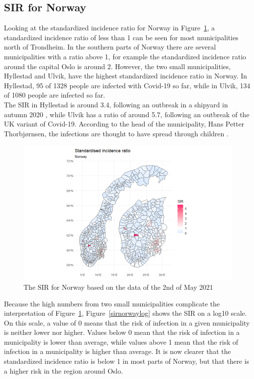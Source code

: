 \subsection{SIR for Norway}
Looking at the standardized incidence ratio for Norway in Figure~\ref{sirnorway}, a standardized incidence ratio of less than 1 can be seen for most municipalities north of Trondheim. In the southern parts of Norway there are several municipalities with a ratio above 1, for example the standardized incidence ratio around the capital Oslo is around 2. However, the two small municipalities, Hyllestad and Ulvik, have the highest standardized incidence ratio in Norway. In Hyllestad, 95 of 1328 people are infected with Covid-19 so far, while in Ulvik, 134 of 1080 people are infected so far. \\
The SIR in Hyllestad is around 3.4, following an outbreak in a shipyard in autumn 2020 \autocite[][]{newspaper1}, while Ulvik has a ratio of around 5.7, following an outbreak of the UK variant of Covid-19. According to the head of the municipality, Hans Petter Thorbjørnsen, the infections are thought to have spread through children \autocite[][]{newspaper2}.
\begin{figure}[H]
 \centering
 \includegraphics[width = 1.2\textwidth]{sir_norway.png}
 \caption{The SIR for Norway based on the data of the 2nd of May 2021}
 \label{sirnorway}
\end{figure}
Because the high numbers from two small municipalities complicate the interpretation of Figure~\ref{sirnorway}, Figure~\ref{sirnorwaylog} shows the SIR on a log10 scale. On this scale, a value of 0 means that the risk of infection in a given municipality is neither lower nor higher. Values below 0 mean that the risk of infection in a municipality is lower than average, while values above 1 mean that the risk of infection in a municipality is higher than average. It is now clearer that the standardized incidence ratio is below 1 in most parts of Norway, but that there is a higher risk in the region around Oslo.
